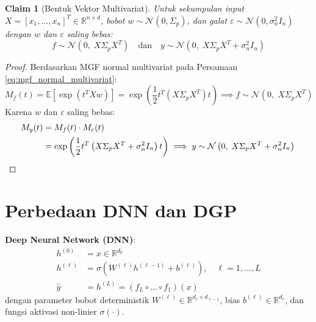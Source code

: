 \documentclass[11pt,a4paper]{article}
\def\boldsymbol#1{#1}%
\def\mathbf#1{#1}%
\theoremstyle{plain}
\newtheorem{claim}{Claim}[section]
\theoremstyle{definition}
\theoremstyle{remark}
\begin{document}
\begin{claim}[Bentuk Vektor Multivariat]
Untuk sekumpulan input $X = [\mathbf{x}_1, \dots, \mathbf{x}_n]^T \in \mathbb{R}^{n \times d}$, bobot $\mathbf{w} \sim \mathcal{N}(\mathbf{0}, \Sigma_p)$, dan galat $\boldsymbol{\varepsilon} \sim \mathcal{N}(\mathbf{0}, \sigma_n^2 I_n)$ dengan $\mathbf{w}$ dan $\boldsymbol{\varepsilon}$ saling bebas:
\begin{equation}
\mathbf{f} \sim \mathcal{N}\left(\mathbf{0}, \; X\Sigma_p X^T\right) \quad \text{dan} \quad \mathbf{y} \sim \mathcal{N}\left(\mathbf{0}, \; X\Sigma_p X^T + \sigma_n^2 I_n\right)
\end{equation}
\end{claim}

\begin{proof}
Berdasarkan MGF normal multivariat pada Persamaan \eqref{eq:mgf_normal_multivariat}:
\begin{equation}
M_{\mathbf{f}}(\mathbf{t}) = \mathbb{E}\left[ \exp(\mathbf{t}^T X \mathbf{w}) \right] = \exp\left( \frac{1}{2}\mathbf{t}^T \left( X\Sigma_p X^T \right) \mathbf{t} \right) \implies \mathbf{f} \sim \mathcal{N}\left(\mathbf{0}, \; X\Sigma_p X^T\right)
\end{equation}
Karena $\mathbf{w}$ dan $\boldsymbol{\varepsilon}$ saling bebas:
\begin{align}
M_{\mathbf{y}}(\mathbf{t}) &= M_{\mathbf{f}}(\mathbf{t}) \cdot M_{\boldsymbol{\varepsilon}}(\mathbf{t}) \nonumber \\
&= \exp\left( \frac{1}{2}\mathbf{t}^T \left( X\Sigma_p X^T + \sigma_n^2 I_n \right) \mathbf{t} \right) \implies \mathbf{y} \sim \mathcal{N}\left(\mathbf{0}, \; X\Sigma_p X^T + \sigma_n^2 I_n\right) \qedhere
\end{align}
\end{proof}

\newpage
\section{Perbedaan DNN dan DGP}
\label{sec:perbedaan_dnn_dgp}

\noindent \textbf{Deep Neural Network (DNN)}:
\begin{align}
\mathbf{h}^{(0)} &= \mathbf{x} \in \mathbb{R}^{d_0} \nonumber \\
\mathbf{h}^{(\ell)} &= \sigma\left( W^{(\ell)} \mathbf{h}^{(\ell-1)} + \mathbf{b}^{(\ell)} \right), \quad \ell = 1, \dots, L \label{eq:dnn_layer} \\
\hat{\mathbf{y}} &= \mathbf{h}^{(L)} = (f_L \circ \dots \circ f_1)(\mathbf{x}) \label{eq:dnn_composition}
\end{align}
dengan parameter bobot deterministik $W^{(\ell)} \in \mathbb{R}^{d_\ell \times d_{\ell-1}}$, bias $\mathbf{b}^{(\ell)} \in \mathbb{R}^{d_\ell}$, dan fungsi aktivasi non-linier $\sigma(\cdot)$.
\end{document}
